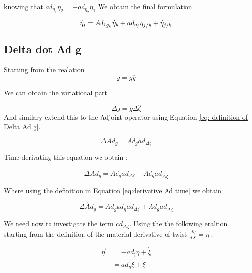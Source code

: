 \documentclass[12pt,a4paper]{book}
\begin{document}
knowing that $ad_{\eta_1} \eta_2 = - ad_{\eta_2} \eta_1$ We obtain the final formulation

\begin{equation}\label{eq:twist derivative final}
	\dot{\eta}_j 	= Ad_{^jg_k} \dot{\eta}_k + ad_{{\eta}_j}  \eta_{j/k} + \dot{\eta}_{j/k} \\
\end{equation}





\subsection{Delta dot Ad g}

Starting from the realation 
\begin{equation}
	\dot{g} = g \hat{\eta}
\end{equation}

We can obtain the variational part 

\begin{equation}
	\Delta g = g \Delta \hat{\zeta}
\end{equation}
 And similary extend this to the Adjoint operator using Equation \eqref{eq: definition of Delta Ad g}.

\begin{equation}\label{eq: Delta Ad g}
	\Delta Ad_g = Ad_g ad_{\Delta \zeta}
\end{equation}


Time derivating this equation we obtain :

\begin{equation}
	\Delta \dot{Ad}_g = \dot{Ad}_g ad_{\Delta \zeta} + Ad_g  ad_{\Delta \dot{\zeta} }
\end{equation}

Where using the definition in Equation \eqref{eq:derivative Ad time} we obtain 

\begin{equation}\label{eq: Delta dot Ad g}
	\Delta \dot{Ad}_g = Ad_g ad_\eta ad_{\Delta \zeta} + Ad_g  ad_{\Delta \dot{\zeta} }
\end{equation}

We need now to investigate the term $ad_{\Delta \dot{\zeta} }$. Using the the following eraltion starting from the definition of the material derivative of twist $\frac{d \eta}{dX} = \eta^\prime $.

\begin{equation}
\begin{aligned}
	\eta^\prime	&= - ad_{\xi} \eta + \dot{\xi} \\
				&= ad_{\eta} \xi + \dot{\xi}
\end{aligned}
\end{equation}
\end{document}
